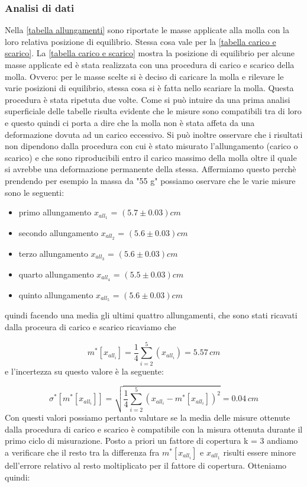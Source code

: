 \subsubsection{Analisi di dati}

Nella \ref{tabella allungamenti} sono riportate le masse applicate alla molla con la loro relativa posizione di equilibrio. Stessa cosa vale per la \ref{tabella carico e scarico}.
La \ref{tabella carico e scarico} mostra la posizione di equilibrio per alcune masse applicate ed è stata realizzata con una procedura di carico e scarico della molla. Ovvero: per le masse scelte si è deciso di caricare la molla e rilevare le varie posizioni di equilibrio, stessa cosa si è fatta nello scariare la molla. Questa procedura è stata ripetuta due volte.
Come si può intuire da una prima analisi superficiale delle tabelle risulta evidente che le misure sono compatibili tra di loro e questo quindi ci porta a dire che la molla non è stata affeta da una deformazione dovuta ad un carico eccessivo. Si può inoltre osservare che i risultati non dipendono dalla procedura con cui è stato misurato l'allungamento (carico o scarico) e che sono riproducibili entro il carico massimo della molla oltre il quale si avrebbe una deformazione permanente della stessa.
Affermiamo questo perchè prendendo per esempio la massa da "55 g" possiamo oservare che le varie misure sono le seguenti:
\begin{itemize}
	\item{primo allungamento $x_{all_1}$ = $(5.7 \pm 0.03) cm$}
	\item{secondo allungamento $x_{all_2}$ = $(5.6 \pm 0.03) cm$}
	\item{terzo allungamento $x_{all_3}$ = $(5.6 \pm 0.03) cm$}
	\item{quarto allungamento $x_{all_4}$ = $(5.5 \pm 0.03) cm$}
	\item{quinto allungamento $x_{all_5}$ = $(5.6 \pm 0.03) cm$}
\end{itemize}
quindi facendo una media gli ultimi quattro allungamenti, che sono stati ricavati dalla proceura di carico e scarico ricaviamo che

\begin{equation*}
	m^*[x_{all_i}] = \frac{1}{4} \sum_{i=2}^{5} (x_{all_i}) = 5.57\, cm
\end{equation*}
%
e l'incertezza su questo valore è la seguente:

\begin{equation*}
	\sigma^*[m^*[x_{all_i}]] = \sqrt{\frac{1}{4} \sum_{i=2}^{5} (x_{all_i} - m^*[x_{all_i}])^2} = 0.04 \,cm
\end{equation*}
%
Con questi valori possiamo pertanto valutare se la media delle misure ottenute dalla procedura di carico e scarico è compatibile con la misura ottenuta durante il primo ciclo di misurazione. Posto a priori un fattore di copertura k = 3 andiamo a verificare che il resto tra la differenza fra $m^*[x_{all_i}]$ e $x_{all_1}$ risulti essere minore dell'errore relativo al resto moltiplicato per il fattore di copertura.
Otteniamo quindi:

